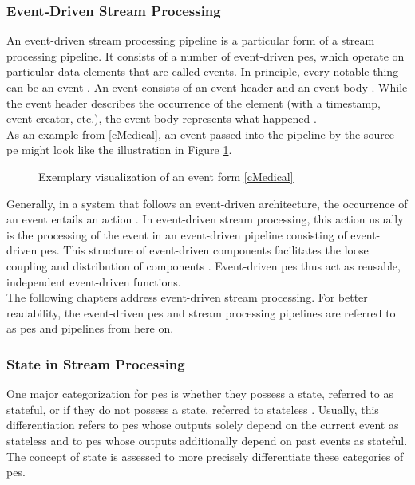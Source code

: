 \subsubsection{Event-Driven Stream Processing}
\label{lEventDrivenStreamProcessing}

An event-driven stream processing pipeline is a particular form of a stream processing pipeline. It consists of a number of event-driven \gls{pe}s, which operate on particular data elements that are called events. In principle, every notable thing can be an event \cite{Michelson.2006}. An event consists of an event header and an event body \cite{Michelson.2006}. While the event header describes the occurrence of the element (with a timestamp, event creator, etc.), the event body represents what happened \cite{Michelson.2006}.\\
As an example from \ref{cMedical}, an event passed into the pipeline by the source \gls{pe} might look like the illustration in Figure \ref{fMedicalEvent}.\par

\begin{figure}[H]
    \centering
    \graphicspath{{./figures/code/}}

\caption{Exemplary visualization of an event form \ref{cMedical}}
\label{fMedicalEvent}
\end{figure}

Generally, in a system that follows an event-driven architecture, the occurrence of an event entails an action \cite{Michelson.2006}. In event-driven stream processing, this action usually is the processing of the event in an event-driven pipeline consisting of event-driven \gls{pe}s. This structure of event-driven components facilitates the loose coupling and distribution of components \cite{Michelson.2006}. Event-driven \gls{pe}s thus act as reusable, independent event-driven functions.\\
The following chapters address event-driven stream processing. For better readability, the event-driven \gls{pe}s and stream processing pipelines are referred to as \gls{pe}s and pipelines from here on.


\subsubsection{State in Stream Processing}
\label{lStateStreamProcessing}

One major categorization for \gls{pe}s is whether they possess a state, referred to as stateful, or if they do not possess a state, referred to stateless \cite{CastroFernandez.2013}. 
Usually, this differentiation refers to \gls{pe}s whose outputs solely depend on the current event as stateless and to \gls{pe}s whose outputs additionally depend on past events as stateful. The concept of state is assessed to more precisely differentiate these categories of \gls{pe}s.\par

